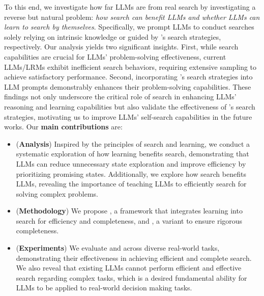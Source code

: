 To this end, we {investigate how far LLMs are from real search} by investigating a reverse but natural problem: \textit{how search can benefit LLMs and whether LLMs can learn to search by themselves}. Specifically, we prompt LLMs to conduct searches solely relying on intrinsic knowledge or guided by \method's search strategies, respectively. Our analysis yields two significant insights. First, while search capabilities are crucial for LLMs' problem-solving effectiveness, current LLMs/LRMs exhibit inefficient search behaviors, requiring extensive sampling to achieve satisfactory performance. Second, incorporating \method's search strategies into LLM prompts demonstrably enhances their problem-solving capabilities. These findings not only underscore the critical role of search in enhancing LLMs' reasoning and learning capabilities but also validate the effectiveness of \method's search strategies, motivating us to improve LLMs' self-search capabilities in the future works. Our \textbf{main contributions} are: 
\begin{itemize}[leftmargin=*,noitemsep, topsep=0pt]
    \item (\textbf{Analysis}) Inspired by the principles of search and learning, we conduct a systematic exploration of how learning benefits search, demonstrating that LLMs can reduce unnecessary state exploration and improve efficiency by prioritizing promising states. Additionally, we explore how search benefits LLMs, revealing the importance of teaching LLMs to efficiently search for solving complex problems.
    \item (\textbf{Methodology}) We propose \method, a framework that integrates learning into search for efficiency and completeness, and \cmethod, a variant to ensure rigorous completeness.
    \item (\textbf{Experiments}) We evaluate \method and \cmethod across diverse real-world tasks, demonstrating their effectiveness in achieving efficient and complete search. We also reveal that existing LLMs cannot perform efficient and effective search regarding complex tasks, which is a desired fundamental ability for LLMs to be applied to real-world decision making tasks.
\end{itemize}
